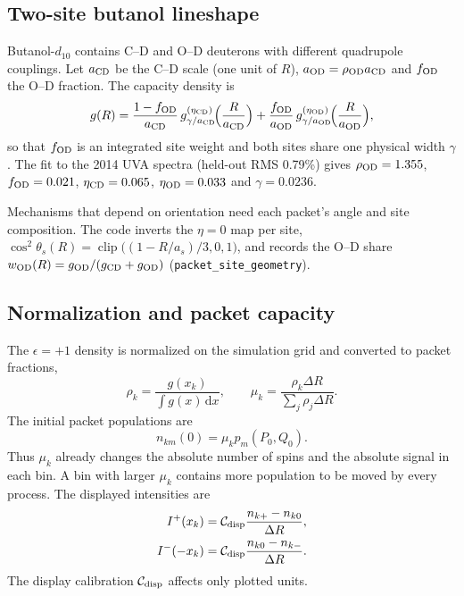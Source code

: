 \documentclass[11pt]{article}
\newcommand{\Iplus}{I^{+}}
\newcommand{\Iminus}{I^{-}}
\newcommand{\dd}{\mathrm{d}}
\newcommand{\clip}{\operatorname{clip}}
\newcommand{\code}[1]{\texttt{#1}}
\begin{document}
\subsection{Two-site butanol lineshape}
\label{sec:twosite}

Butanol-\(d_{10}\) contains C--D and O--D deuterons with different quadrupole couplings. Let
\(a_{\rm CD}\) be the C--D scale (one unit of \(R\)), \(a_{\rm OD}=\rho_{\rm OD}a_{\rm CD}\) and
\(f_{\rm OD}\) the O--D fraction. The capacity density is
\begin{equation}
g(R) = \frac{1-f_{\rm OD}}{a_{\rm CD}}\,g_{\gamma/a_{\rm CD}}^{(\eta_{\rm CD})}\!\Bigl(\frac{R}{a_{\rm CD}}\Bigr)
+\frac{f_{\rm OD}}{a_{\rm OD}}\,g_{\gamma/a_{\rm OD}}^{(\eta_{\rm OD})}\!\Bigl(\frac{R}{a_{\rm OD}}\Bigr),
\label{eq:multisite}
\end{equation}
so that \(f_{\rm OD}\) is an integrated site weight and both sites share one physical width
\(\gamma\). The fit to the 2014 UVA spectra (held-out RMS 0.79\%) gives
\(\rho_{\rm OD}=1.355\), \(f_{\rm OD}=0.021\), \(\eta_{\rm CD}=0.065\), \(\eta_{\rm OD}=0.033\) and
\(\gamma=0.0236\).

Mechanisms that depend on orientation need each packet's angle and site composition. The code
inverts the \(\eta=0\) map per site,
\(\cos^2\theta_s(R)=\clip\bigl((1-R/a_s)/3,0,1\bigr)\), and records the O--D share
\(w_{\rm OD}(R)=g_{\rm OD}/(g_{\rm CD}+g_{\rm OD})\) (\code{packet\_site\_geometry}).

\subsection{Normalization and packet capacity}

The \(\epsilon=+1\) density is normalized on the simulation grid and converted to packet
fractions,
\begin{equation}
  \rho_k=\frac{g(x_k)}{\int g(x)\,\dd x},
  \qquad
  \mu_k = \frac{\rho_k\Delta R}{\sum_j\rho_j\Delta R}.
  \label{eq:muk}
\end{equation}
The initial packet populations are
\begin{equation}
  n_{km}(0)=\mu_k p_m(P_0,Q_0).
  \label{eq:initpacket}
\end{equation}
Thus \(\mu_k\) already changes the absolute number of spins and the absolute signal in each bin.
A bin with larger \(\mu_k\) contains more population to be moved by every process. The displayed
intensities are
\begin{align}
  \Iplus(x_k)&=\mathcal C_{\rm disp}\frac{n_{k+}-n_{k0}}{\Delta R},
  \label{eq:displayIplus}\\
  \Iminus(-x_k)&=\mathcal C_{\rm disp}\frac{n_{k0}-n_{k-}}{\Delta R}.
  \label{eq:displayIminus}
\end{align}
The display calibration \(\mathcal C_{\rm disp}\) affects only plotted units.
\end{document}
